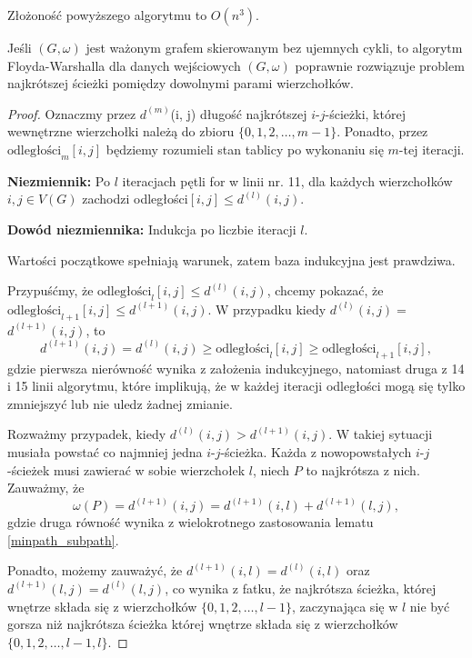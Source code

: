 Złożoność powyższego algorytmu to $O(n^3)$.

\begin{theorem}
	Jeśli $(G, \omega)$ jest ważonym grafem skierowanym
	bez ujemnych cykli, to algorytm Floyda-Warshalla dla 
	danych wejściowych $(G, \omega)$ poprawnie
	rozwiązuje problem najkrótszej ścieżki 
	pomiędzy dowolnymi parami wierzchołków.
	
	\begin{proof}
		Oznaczmy przez $d^{(m)}$(i, j) długość najkrótszej
		$i$-$j$-ścieżki, której wewnętrzne wierzchołki 
		należą do zbioru $\{0, 1, 2, \dots, m-1\}$. 
		Ponadto, przez
		$\text{odległości}_{m}[i, j]$ będziemy rozumieli 
		stan tablicy po 
		wykonaniu się $m$-tej iteracji.
		
		\textbf{Niezmiennik:} Po $l$ iteracjach 
		pętli for w linii nr. 11, dla każdych wierzchołków
		$i, j \in V(G)$ zachodzi odległości$[i,j] \leq d^{(l)}(i,j)$.
		
		\textbf{Dowód niezmiennika:} Indukcja po liczbie iteracji $l$.
		
		Wartości początkowe spełniają warunek, zatem
		baza indukcyjna jest prawdziwa. 
		
		Przypuśćmy, że $\text{odległości}_{l}[i, j] \leq
		d^{(l)}(i, j)$, chcemy pokazać, że 
		$\text{odległości}_{l+1}[i, j] \leq$$ d^{(l+1)}(i, j)$.
		W przypadku kiedy $d^{(l)}(i,j) =$$ d^{(l+1)}(i,j)$, to
		\[d^{(l+1)}(i,j) = d^{(l)}(i, j) \geq 
		\text{odległości}_l[i, j] \geq \text{odległości}_{l+1}[i, j],\]
		gdzie pierwsza nierówność wynika z założenia indukcyjnego, natomiast
		druga z 14 i 15 linii algorytmu, które implikują, że
		w każdej iteracji odległości mogą się tylko zmniejszyć lub
		nie uledz żadnej zmianie.
		
		Rozważmy przypadek, kiedy $d^{(l)}(i,j) >$$ d^{(l+1)}(i,j)$. 
		W takiej sytuacji musiała powstać co najmniej jedna 
		$i$-$j$-ścieżka. Każda z nowopowstałych $i$-$j$-ścieżek
		musi zawierać w sobie wierzchołek $l$, niech 
		$P$ to najkrótsza z nich. Zauważmy, że
		\[\omega(P) = d^{(l+1)}(i, j) = 
		d^{(l+1)}(i, l) + d^{(l+1)}(l, j),\]
		gdzie druga równość wynika z wielokrotnego zastosowania 
		lematu \ref{minpath_subpath}.
		
		Ponadto, możemy zauważyć, że $d^{(l+1)}(i, l) = d^{(l)}(i, l)$ 
		oraz $d^{(l+1)}(l, j) = d^{(l)}(l, j)$, co wynika z fatku, że
		najkrótsza ścieżka, której wnętrze składa się z wierzchołków 
		$\{0, 1, 2, \dots, l-1\}$, zaczynająca się w $l$ 
		nie być gorsza niż najkrótsza ścieżka której 
		wnętrze składa się z wierzchołków 
		$\{0, 1, 2, \dots, l-1, l\}$.
		

\end{proof}
\end{theorem}
